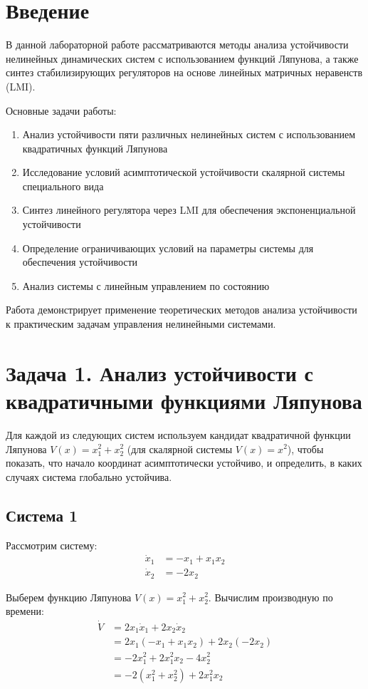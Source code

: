 \section{Введение}

В данной лабораторной работе рассматриваются методы анализа устойчивости нелинейных динамических систем с использованием функций Ляпунова, а также синтез стабилизирующих регуляторов на основе линейных матричных неравенств (LMI).

Основные задачи работы:
\begin{enumerate}
\item Анализ устойчивости пяти различных нелинейных систем с использованием квадратичных функций Ляпунова
\item Исследование условий асимптотической устойчивости скалярной системы специального вида
\item Синтез линейного регулятора через LMI для обеспечения экспоненциальной устойчивости
\item Определение ограничивающих условий на параметры системы для обеспечения устойчивости
\item Анализ системы с линейным управлением по состоянию
\end{enumerate}

Работа демонстрирует применение теоретических методов анализа устойчивости к практическим задачам управления нелинейными системами.

\section{Задача 1. Анализ устойчивости с квадратичными функциями Ляпунова}

Для каждой из следующих систем используем кандидат квадратичной функции Ляпунова $V(x) = x_1^2 + x_2^2$ (для скалярной системы $V(x) = x^2$), чтобы показать, что начало координат асимптотически устойчиво, и определить, в каких случаях система глобально устойчива.

\subsection{Система 1}

Рассмотрим систему:
\begin{align}
\dot{x}_1 &= -x_1 + x_1 x_2 \\
\dot{x}_2 &= -2x_2
\end{align}

Выберем функцию Ляпунова $V(x) = x_1^2 + x_2^2$. Вычислим производную по времени:
\begin{align}
\dot{V} &= 2x_1 \dot{x}_1 + 2x_2 \dot{x}_2 \\
&= 2x_1(-x_1 + x_1 x_2) + 2x_2(-2x_2) \\
&= -2x_1^2 + 2x_1^2 x_2 - 4x_2^2 \\
&= -2(x_1^2 + x_2^2) + 2x_1^2 x_2
\end{align}

